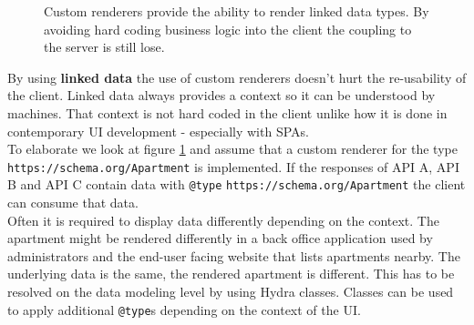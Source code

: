 \begin{figure}[!htb]
  \caption{Custom renderers provide the ability to render linked data types. By avoiding hard coding business logic into the client the coupling to the server is still lose.}
  \label{fig:linkeddata}
\end{figure}

By using \textbf{linked data} the use of custom renderers doesn't hurt the re-usability of the client. Linked data always provides a context so it can be understood by machines. That context is not hard coded in the client unlike how it is done in contemporary UI development - especially with SPAs. \\
To elaborate we look at figure \ref{fig:linkeddata} and assume that a custom renderer for the type \lstinline{https://schema.org/Apartment} is implemented. If the responses of API A, API B and API C contain data with \lstinline{@type} \lstinline{https://schema.org/Apartment} the client can consume that data. \\
Often it is required to display data differently depending on the context. The apartment might be rendered differently in a back office application used by administrators and the end-user facing website that lists apartments nearby. The underlying data is the same, the rendered apartment is different. This has to be resolved on the data modeling level by using Hydra classes. Classes can be used to apply additional \lstinline{@type}s depending on the context of the UI.
